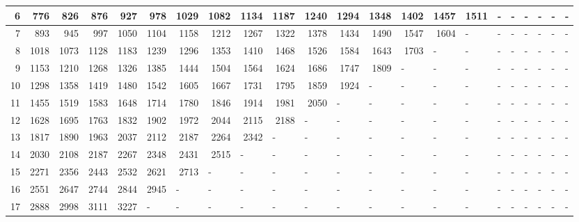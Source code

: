 \begin{appendices}
\begin{table}[H]
\begin{minipage}[b]{18.5cm}
\begin{turn}{-90}
{\begin{tabular}{|r|r|r|r|r|r|r|r|r|r|r|r|l|l|l|l|l|l|l|l|l|l|}
6 & 776 & 826 & 876 & 927 & 978 & 1029 & 1082 & 1134 & 1187 & 1240 & 1294 & \multicolumn{1}{r|}{1348} & \multicolumn{1}{r|}{1402} & \multicolumn{1}{r|}{1457} & \multicolumn{1}{r|}{1511} & - & - & - & - & - & - \\ \hline
7 & 893 & 945 & 997 & 1050 & 1104 & 1158 & 1212 & 1267 & 1322 & 1378 & 1434 & \multicolumn{1}{r|}{1490} & \multicolumn{1}{r|}{1547} & \multicolumn{1}{r|}{1604} & - & - & - & - & - & - & - \\ \hline
8 & 1018 & 1073 & 1128 & 1183 & 1239 & 1296 & 1353 & 1410 & 1468 & 1526 & 1584 & \multicolumn{1}{r|}{1643} & \multicolumn{1}{r|}{1703} & - & - & - & - & - & - & - & - \\ \hline
9 & 1153 & 1210 & 1268 & 1326 & 1385 & 1444 & 1504 & 1564 & 1624 & 1686 & 1747 & \multicolumn{1}{r|}{1809} & - & - & - & - & - & - & - & - & - \\ \hline
10 & 1298 & 1358 & 1419 & 1480 & 1542 & 1605 & 1667 & 1731 & 1795 & 1859 & 1924 & - & - & - & - & - & - & - & - & - & - \\ \hline
11 & 1455 & 1519 & 1583 & 1648 & 1714 & 1780 & 1846 & 1914 & 1981 & 2050 & \multicolumn{1}{l|}{-} & - & - & - & - & - & - & - & - & - & - \\ \hline
12 & 1628 & 1695 & 1763 & 1832 & 1902 & 1972 & 2044 & 2115 & 2188 & \multicolumn{1}{l|}{-} & \multicolumn{1}{l|}{-} & - & - & - & - & - & - & - & - & - & - \\ \hline
13 & 1817 & 1890 & 1963 & 2037 & 2112 & 2187 & 2264 & 2342 & \multicolumn{1}{l|}{-} & \multicolumn{1}{l|}{-} & \multicolumn{1}{l|}{-} & - & - & - & - & - & - & - & - & - & - \\ \hline
14 & 2030 & 2108 & 2187 & 2267 & 2348 & 2431 & 2515 & \multicolumn{1}{l|}{-} & \multicolumn{1}{l|}{-} & \multicolumn{1}{l|}{-} & \multicolumn{1}{l|}{-} & - & - & - & - & - & - & - & - & - & - \\ \hline
15 & 2271 & 2356 & 2443 & 2532 & 2621 & 2713 & \multicolumn{1}{l|}{-} & \multicolumn{1}{l|}{-} & \multicolumn{1}{l|}{-} & \multicolumn{1}{l|}{-} & \multicolumn{1}{l|}{-} & - & - & - & - & - & - & - & - & - & - \\ \hline
16 & 2551 & 2647 & 2744 & 2844 & 2945 & \multicolumn{1}{l|}{-} & \multicolumn{1}{l|}{-} & \multicolumn{1}{l|}{-} & \multicolumn{1}{l|}{-} & \multicolumn{1}{l|}{-} & \multicolumn{1}{l|}{-} & - & - & - & - & - & - & - & - & - & - \\ \hline
17 & 2888 & 2998 & 3111 & 3227 & \multicolumn{1}{l|}{-} & \multicolumn{1}{l|}{-} & \multicolumn{1}{l|}{-} & \multicolumn{1}{l|}{-} & \multicolumn{1}{l|}{-} & \multicolumn{1}{l|}{-} & \multicolumn{1}{l|}{-} & - & - & - & - & - & - & - & - & - & - \\ \hline

\end{tabular}}
\end{turn}
\end{minipage}
\end{table}
\end{appendices}
